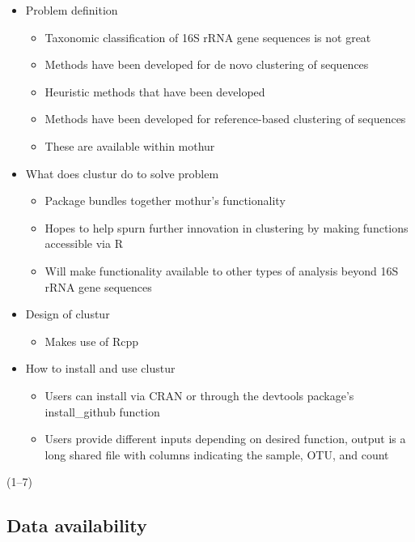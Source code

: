 \documentclass[
  11pt,
]{article}
\providecommand{\tightlist}{%
  \setlength{\itemsep}{0pt}\setlength{\parskip}{0pt}}\usepackage{longtable,booktabs,array}
\begin{document}
\begin{itemize}
\tightlist
\item
  Problem definition

  \begin{itemize}
  \tightlist
  \item
    Taxonomic classification of 16S rRNA gene sequences is not great
  \item
    Methods have been developed for de novo clustering of sequences
  \item
    Heuristic methods that have been developed
  \item
    Methods have been developed for reference-based clustering of
    sequences
  \item
    These are available within mothur
  \end{itemize}
\item
  What does clustur do to solve problem

  \begin{itemize}
  \tightlist
  \item
    Package bundles together mothur's functionality
  \item
    Hopes to help spurn further innovation in clustering by making
    functions accessible via R
  \item
    Will make functionality available to other types of analysis beyond
    16S rRNA gene sequences
  \end{itemize}
\item
  Design of clustur

  \begin{itemize}
  \tightlist
  \item
    Makes use of Rcpp
  \end{itemize}
\item
  How to install and use clustur

  \begin{itemize}
  \tightlist
  \item
    Users can install via CRAN or through the devtools package's
    install\_github function
  \item
    Users provide different inputs depending on desired function, output
    is a long shared file with columns indicating the sample, OTU, and
    count
  \end{itemize}
\end{itemize}

(1--7)

\subsection{Data availability}\label{data-availability}
\end{document}
